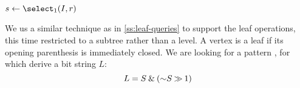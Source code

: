 \begin{algorithm}
\begin{algorithmic}
	 
		\State {}
	\Else
		\State {}
	\EndIf
\EndFunction
\end{algorithmic}
\end{algorithm}

\begin{algorithm}
\begin{algorithmic}
	\State $s \gets \select_1(I, r)$
	 
		\State {}
	\Else
		\State {}
	\EndIf
\EndFunction
\end{algorithmic}
\end{algorithm}

\bigbreak

We us a similar technique as in \ref{ss:leaf-queries} to support the leaf operations, this time restricted to a subtree rather than a level.
A vertex is a leaf if its opening parenthesis is immediately closed.
We are looking for a pattern \str{()}, for which derive a bit string $L$:
$$L = S \mathbin{\&} (\mathord{\sim} S \mathbin{\gg} 1)$$

\begin{algorithm}
\begin{algorithmic}
		\State {}
	\Else
		\State {}
	\EndIf
\EndFunction
\end{algorithmic}
\end{algorithm}

\begin{algorithm}
\begin{algorithmic}	
 
		\State {}
	\Else
		\State {}
	\EndIf
\EndFunction
\end{algorithmic}
\end{algorithm}

\begin{algorithm}
\begin{algorithmic}
		\State {}
	\Else
		\State {}
	\EndIf
\EndFunction
\end{algorithmic}
\end{algorithm}

